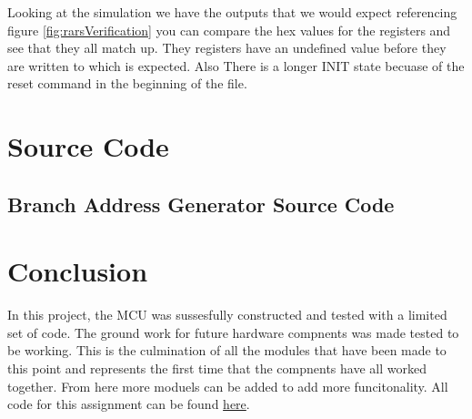\documentclass[
    a4paper, %
	12pt, %
    ]{CSSullivanBusinessReport}
\begin{document}
\begin{fullwidth}
Looking at the simulation we have the outputs that we would expect referencing figure \ref{fig:rarsVerification} you can compare the hex values for the registers and see that they all match up. They registers have an undefined value before they are written to which is expected. Also There is a longer INIT state becuase of the reset command in the beginning of the file.

\newpage
\section{Source Code}
\captionsetup{style=widetable}
\subsection{Branch Address Generator Source Code} %


\newpage




\newpage





\section{Conclusion} %
\hypersetup{urlcolor=blue} 
In this project, the MCU was sussesfully constructed and tested with a limited set of code. The ground work for future hardware compnents was made tested to be working. This is the culmination of all the modules that have been made to this point and represents the first time that the compnents have all worked together. From here more moduels can be added to add more funcitonality.
All code for this assignment can be found \href{https://github.com/EthanV1920/CPE-233-Otter/tree/main}{here}.


\end{fullwidth}
\end{document}
